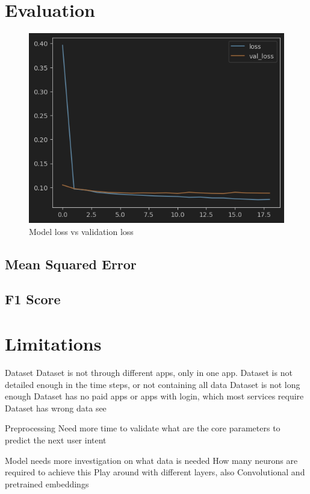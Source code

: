 \section{Evaluation}

\begin{figure}
  \centering
  \includegraphics[width=\textwidth]{graphics/model_history_loss}
  \caption{Model loss vs validation loss}
  \label{fig:model_history_loss}
\end{figure}

\subsection{Mean Squared Error}
\subsection{F1 Score}
\section{Limitations}

Dataset
Dataset is not through different apps, only in one app.
Dataset is not detailed enough in the time steps, or not containing all data
Dataset is not long enough
Dataset has no paid apps or apps with login, which most services require
Dataset has wrong data see \cite{clay}

Preprocessing
Need more time to validate what are the core parameters to predict the next user intent


Model needs more investigation on what data is needed
How many neurons are required to achieve this
Play around with different layers, also Convolutional and pretrained embeddings
